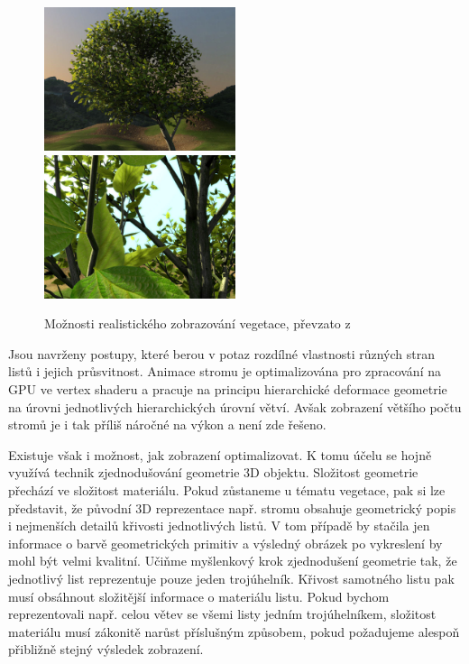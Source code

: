 \begin{figure}[here]
\includegraphics[width=0.5\textwidth]{./figures/HABEL_tree.jpg}
\includegraphics[width=0.5\textwidth]{./figures/HABEL_leaves.jpg}
\caption[Možnosti realistického zobrazování vegetace]%
{Možnosti realistického zobrazování vegetace, převzato z \cite{Habel_2007_RTT} }
\label{fig:HABEL_leaves}
\end{figure}
Jsou navrženy postupy, které berou v potaz rozdílné vlastnosti různých stran listů i jejich průsvitnost. Animace stromu je optimalizována pro zpracování na GPU ve vertex shaderu a pracuje na principu hierarchické deformace geometrie na úrovni jednotlivých hierarchických úrovní větví. Avšak zobrazení většího počtu stromů je i tak příliš náročné na výkon a není zde řešeno.

Existuje však i možnost, jak zobrazení optimalizovat. K tomu účelu se hojně využívá technik zjednodušování geometrie 3D objektu. Složitost geometrie přechází ve složitost materiálu. Pokud zůstaneme u tématu vegetace, pak si lze představit, že původní 3D reprezentace např. stromu obsahuje geometrický popis i nejmenších detailů křivosti jednotlivých listů. V tom případě by stačila jen informace o barvě geometrických primitiv a výsledný obrázek po vykreslení by mohl být velmi kvalitní. Učiňme myšlenkový krok zjednodušení geometrie tak, že jednotlivý list reprezentuje pouze jeden trojúhelník. Křivost samotného listu pak musí obsáhnout složitější informace o materiálu listu. Pokud bychom reprezentovali např. celou větev se všemi listy jedním trojúhelníkem, složitost materiálu musí zákonitě narůst příslušným způsobem, pokud požadujeme alespoň přibližně stejný výsledek zobrazení.


